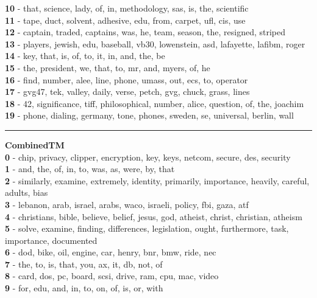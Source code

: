 \textbf{10} - that, science, lady, of, in, methodology, sas, is, the, scientific\\
\textbf{11} - tape, duct, solvent, adhesive, edu, from, carpet, ufl, cis, use\\
\textbf{12} - captain, traded, captains, was, he, team, season, the, resigned, striped\\
\textbf{13} - players, jewish, edu, baseball, vb30, lowenstein, asd, lafayette, lafibm, roger\\
\textbf{14} - key, that, is, of, to, it, in, and, the, be\\
\textbf{15} - the, president, we, that, to, mr, and, myers, of, he\\
\textbf{16} - find, number, alee, line, phone, umass, out, ecs, to, operator\\
\textbf{17} - gvg47, tek, valley, daily, verse, petch, gvg, chuck, grass, lines\\
\textbf{18} - 42, significance, tiff, philosophical, number, alice, question, of, the, joachim\\
\textbf{19} - phone, dialing, germany, tone, phones, sweden, se, universal, berlin, wall\\
\hrule\vspace{2mm}
\noindent
\textbf{CombinedTM}\vspace{2mm}\\
\vspace{2mm}
\noindent
\textbf{0} - chip, privacy, clipper, encryption, key, keys, netcom, secure, des, security\\
\textbf{1} - and, the, of, in, to, was, as, were, by, that\\
\textbf{2} - similarly, examine, extremely, identity, primarily, importance, heavily, careful, adults, bias\\
\textbf{3} - lebanon, arab, israel, arabs, waco, israeli, policy, fbi, gaza, atf\\
\textbf{4} - christians, bible, believe, belief, jesus, god, atheist, christ, christian, atheism\\
\textbf{5} - solve, examine, finding, differences, legislation, ought, furthermore, task, importance, documented\\
\textbf{6} - dod, bike, oil, engine, car, henry, bnr, bmw, ride, nec\\
\textbf{7} - the, to, is, that, you, ax, it, db, not, of\\
\textbf{8} - card, dos, pc, board, scsi, drive, ram, cpu, mac, video\\
\textbf{9} - for, edu, and, in, to, on, of, is, or, with\\
